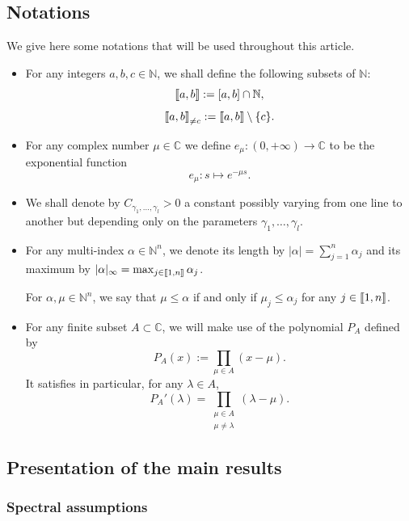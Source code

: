 \documentclass[10pt]{amsart}
\theoremstyle{definition}\newtheorem{defi}[theo]{Definition}\newtheorem{rema}[theo]{Remark}\newtheorem{exam}[theo]{Example}\newtheorem{exem}[theo]{Example}\newtheorem{nota}[theo]{Notation}
\newcommand{\llbracket}{\mathopen{[\mkern -2.7mu[}}
\newcommand{\rrbracket}{\mathclose{]\mkern -2.7mu]}}
\newcommand{\inter}[2]{\llbracket #1,#2 \rrbracket}
\newcommand{\interexclu}[3]{\llbracket #1,#2\rrbracket_{\neq #3}}
\newcommand{\N}{\mathbb{N}}
\newcommand{\C}{\mathbb{C}}
\begin{document}
\subsection{Notations}
We give here some notations that will be used throughout this article.
\begin{itemize}
\item For any integers $a,b,c\in \N$, we shall define the following subsets of $\N$:
\[
\inter{a}{b} := [a,b]\cap \N,
\]
\[
\interexclu{a}{b}{c} := \inter{a}{b}\setminus \{c\}.
\]
\item For any complex number $\mu\in \C$ we define $e_\mu:(0,+\infty)\to \C$ to be the exponential function
\begin{equation}\label{def_emu}
e_\mu:s\mapsto e^{-\mu s}.
\end{equation}
\item We shall denote by $C_{\gamma_1,\dotsc,\gamma_l}>0$ a constant possibly varying from one line to another but depending only on the parameters $\gamma_1,\dotsc,\gamma_l$.
\item For any multi-index $\alpha\in \N^n$, we denote its length by $|\alpha| = \sum_{j=1}^n \alpha_j$ and its maximum by $|\alpha|_\infty=\max_{j\in \inter{1}{n}} \alpha_j$.

For $\alpha,\mu\in \N^n$, we say that $\mu\leq \alpha$ if and only if $\mu_j\leq \alpha_j$ for any $j\in \inter{1}{n}$.
\item For any finite subset $A\subset \C$, we will make use of the polynomial $P_A$ defined by
\begin{equation}\label{Def:P}
P_A(x):=\prod_{\mu\in A} (x-\mu).
\end{equation}
It satisfies in particular, for any $\lambda\in A$,
\begin{equation*}\label{Def:P'}
P_A'(\lambda) = \prod_{ \substack{ \mu \in A \\ \mu \neq \lambda}} (\lambda - \mu).
\end{equation*}
\end{itemize}


\subsection{Presentation of the main results}

\subsubsection{Spectral assumptions} \label{Subsec:SpectralAssumptions}
\end{document}
